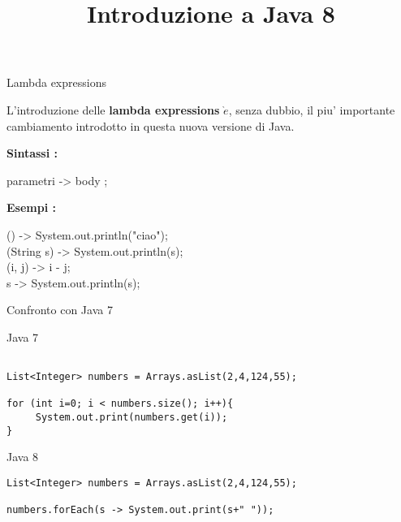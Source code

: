\documentclass{beamer}
\title[Teoria dei Linguaggi di Programmazione]
{Introduzione a Java 8}
\author[Universit$\grave{a}$ degli Studi di Firenze] {}
\institute[]{}
\date[Bani Gabriele] {}
\begin{document}
\begin{frame}
  \titlepage
\end{frame}

\begin{frame}{Lambda expressions}
\begin{flushleft}
L'introduzione delle \textbf{lambda expressions} $\grave{e}$, senza dubbio, il piu' importante cambiamento introdotto in questa nuova versione di Java.
\end{flushleft}
\begin{flushleft}
\textbf{Sintassi :}
\end{flushleft}
\begin{center}
 parametri -> body ;
\end{center}
\begin{flushleft}
\textbf{Esempi :}
\end{flushleft}
\begin{flushleft}
() -> System.out.println("ciao");\\
(String s) -> System.out.println(s);\\
(i, j) -> i - j;\\
s -> System.out.println(s);\\
\end{flushleft}
\end{frame}

\begin{frame}[fragile]{Confronto con Java 7}
\begin{block}{Java 7}
\begin{verbatim}

List<Integer> numbers = Arrays.asList(2,4,124,55);

for (int i=0; i < numbers.size(); i++){
     System.out.print(numbers.get(i));
}
\end{verbatim}
\end{block}
\begin{block}{Java 8}
\begin{verbatim}
List<Integer> numbers = Arrays.asList(2,4,124,55);

numbers.forEach(s -> System.out.print(s+" "));

\end{verbatim}
\end{block}
\end{frame}
\end{document}
